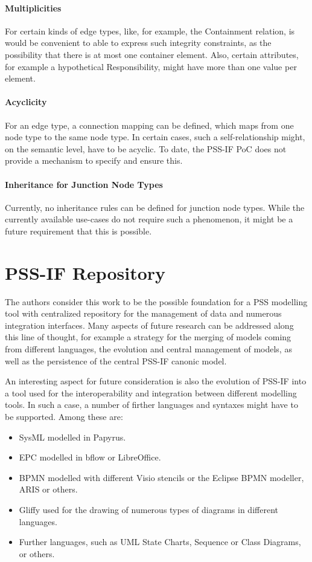 \paragraph{Multiplicities}

For certain kinds of edge types, like, for example, the Containment relation, is would be convenient to able to express such integrity constraints, as the possibility that there is at most one container element. Also, certain attributes, for example a hypothetical Responsibility, might have more than one value per element.

\paragraph{Acyclicity}

For an edge type, a connection mapping can be defined, which maps from one node type to the same node type. In certain cases, such a self-relationship might, on the semantic level, have to be acyclic. To date, the PSS-IF PoC does not provide a mechanism to specify and ensure this.

\paragraph{Inheritance for Junction Node Types}

Currently, no inheritance rules can be defined for junction node types. While the currently available use-cases do not require such a phenomenon, it might be a future requirement that this is possible.

\section{PSS-IF Repository}
\label{sec:outlook:repo}

The authors consider this work to be the possible foundation for a PSS modelling tool with centralized repository for the management of data and numerous integration interfaces. Many aspects of future research can be addressed along this line of thought, for example a strategy for the merging of models coming from different languages, the evolution and central management of models, as well as the persistence of the central PSS-IF canonic model.

An interesting aspect for future consideration is also the evolution of PSS-IF into a tool used for the interoperability and integration between different modelling tools. In such a case, a number of firther languages and syntaxes might have to be supported. Among these are:

\begin{itemize}
\item SysML modelled in Papyrus.
\item EPC modelled in bflow or LibreOffice.
\item BPMN modelled with different Visio stencils or the Eclipse BPMN modeller, ARIS or others.
\item Gliffy used for the drawing of numerous types of diagrams in different languages.
\item Further languages, such as UML State Charts, Sequence or Class Diagrams, or others.
\end{itemize}